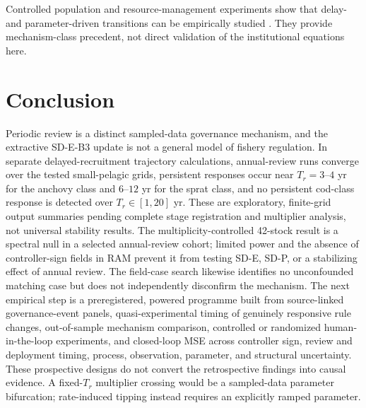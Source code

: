 \documentclass[11pt]{article}
\begin{document}
Controlled population and resource-management experiments show that delay- and parameter-driven transitions can be empirically studied \cite{costantino1995,moxnes1998}. They provide mechanism-class precedent, not direct validation of the institutional equations here.

\section{Conclusion}

Periodic review is a distinct sampled-data governance mechanism, and the extractive SD-E-B3 update is not a general model of fishery regulation. In separate delayed-recruitment trajectory calculations, annual-review runs converge over the tested small-pelagic grids, persistent responses occur near $T_r=3$--$4$ yr for the anchovy class and $6$--$12$ yr for the sprat class, and no persistent cod-class response is detected over $T_r\in[1,20]$ yr. These are exploratory, finite-grid output summaries pending complete stage registration and multiplier analysis, not universal stability results. The multiplicity-controlled 42-stock result is a spectral null in a selected annual-review cohort; limited power and the absence of controller-sign fields in RAM prevent it from testing SD-E, SD-P, or a stabilizing effect of annual review. The field-case search likewise identifies no unconfounded matching case but does not independently disconfirm the mechanism. The next empirical step is a preregistered, powered programme built from source-linked governance-event panels, quasi-experimental timing of genuinely responsive rule changes, out-of-sample mechanism comparison, controlled or randomized human-in-the-loop experiments, and closed-loop MSE across controller sign, review and deployment timing, process, observation, parameter, and structural uncertainty. These prospective designs do not convert the retrospective findings into causal evidence. A fixed-$T_r$ multiplier crossing would be a sampled-data parameter bifurcation; rate-induced tipping instead requires an explicitly ramped parameter.
\end{document}
